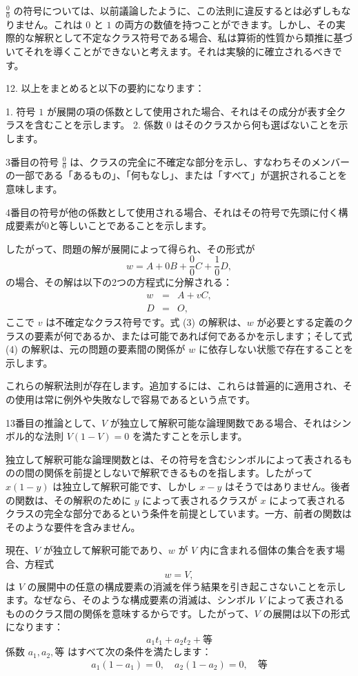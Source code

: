 \documentclass[a4paper,11pt,openany]{ltjsbook}
\begin{document}
$\frac{0}{0}$ の符号については、以前議論したように、この法則に違反するとは必ずしもなりません。これは $0$ と $1$ の両方の数値を持つことができます。しかし、その実際的な解釈として不定なクラス符号である場合、私は算術的性質から類推に基づいてそれを導くことができないと考えます。それは実験的に確立されるべきです。

12. 以上をまとめると以下の要約になります：

1. 符号 $1$ が展開の項の係数として使用された場合、それはその成分が表す全クラスを含むことを示します。
2. 係数 $0$ はそのクラスから何も選ばないことを示します。

3番目の符号 $\frac{0}{0}$ は、クラスの完全に不確定な部分を示し、すなわちそのメンバーの一部である「あるもの」、「何もなし」、または「すべて」が選択されることを意味します。

4番目の符号が他の係数として使用される場合、それはその符号で先頭に付く構成要素が0と等しいことであることを示します。

したがって、問題の解が展開によって得られ、その形式が
\[
w = A + 0B + \frac{0}{0}C + \frac{1}{0}D,
\]
の場合、その解は以下の2つの方程式に分解される：
\begin{eqnarray}
w &=& A + vC,\\
D &=& O,
\end{eqnarray}
ここで $v$ は不確定なクラス符号です。式 (3) の解釈は、$w$ が必要とする定義のクラスの要素が何であるか、または可能であれば何であるかを示します；そして式 (4) の解釈は、元の問題の要素間の関係が $w$ に依存しない状態で存在することを示します。

これらの解釈法則が存在します。追加するには、これらは普遍的に適用され、その使用は常に例外や失敗なしで容易であるという点です。

13番目の推論として、$V$ が独立して解釈可能な論理関数である場合、それはシンボル的な法則 $V(1-V) = 0$ を満たすことを示します。

独立して解釈可能な論理関数とは、その符号を含むシンボルによって表されるものの間の関係を前提としないで解釈できるものを指します。したがって $x(1-y)$ は独立して解釈可能です、しかし $x-y$ はそうではありません。後者の関数は、その解釈のために $y$ によって表されるクラスが $x$ によって表されるクラスの完全な部分であるという条件を前提としています。一方、前者の関数はそのような要件を含みません。

現在、$V$ が独立して解釈可能であり、$w$ が $V$ 内に含まれる個体の集合を表す場合、方程式
\[
w = V,
\]
は $V$ の展開中の任意の構成要素の消滅を伴う結果を引き起こさないことを示します。なぜなら、そのような構成要素の消滅は、シンボル $V$ によって表されるもののクラス間の関係を意味するからです。したがって、$V$ の展開は以下の形式になります：
\[
a_1t_1 + a_2t_2 + \textrm{等}
\]
係数 $a_1, a_2, 等$ はすべて次の条件を満たします：
\[
a_1(1-a_1) = 0, \quad a_2 (1-a_2) = 0, \quad \textrm{等}
\]
\end{document}
